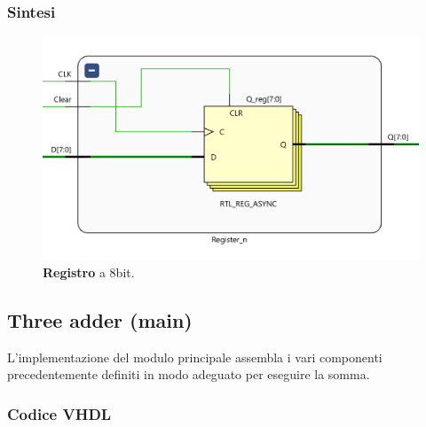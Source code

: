 \documentclass[12pt]{article}
\begin{document}
        \subsubsection{Sintesi}
            \begin{figure}[ht]
                \centering
                \includegraphics[scale=0.45]{Register.png}
                \caption{\textbf{Registro} a 8bit.}
            \end{figure}

    \subsection{Three adder (main)}
        L'implementazione del modulo principale assembla i vari componenti precedentemente definiti in modo adeguato per eseguire la somma.

        \subsubsection{Codice VHDL}
            
        
\end{document}
